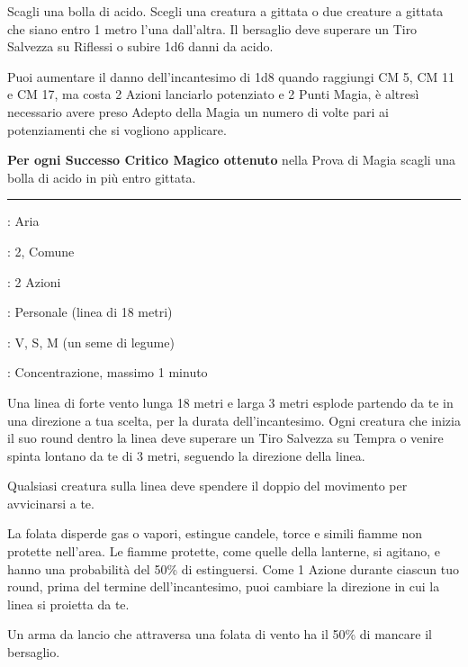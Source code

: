 \begin{multicols}{2}
Scagli una bolla di acido. Scegli una creatura a gittata o due creature a gittata che siano entro 1 metro l'una dall'altra. Il bersaglio deve superare un Tiro Salvezza su Riflessi o subire 1d6 danni da acido.

Puoi aumentare il danno dell'incantesimo di 1d8 quando raggiungi CM 5, CM 11 e CM 17, ma costa 2 Azioni lanciarlo potenziato e 2 Punti Magia, è altresì necessario avere preso Adepto della Magia un numero di volte pari ai potenziamenti che si vogliono applicare.

\textbf{Per ogni Successo Critico Magico ottenuto} nella Prova di Magia scagli una bolla di acido in più entro gittata.

\smallskip\noindent\rule{\linewidth}{2pt} \hypertarget{Folata di Vento}{}\smallskip{}
\noindent
\begin{description}[noitemsep, topsep=0pt, parsep=0pt, partopsep=0pt, leftmargin=0cm, labelwidth=2.8cm]
	\item[\textbf{Lista di Magia}]: Aria
	\item[\textbf{Livello}]: 2, Comune
	\item[\textbf{T. di Lancio}]: 2 Azioni
	\item[\textbf{Gittata}]: Personale (linea di 18 metri)
	\item[\textbf{Componenti}]: V, S, M (un seme di legume)
	\item[\textbf{Durata}]: Concentrazione, massimo 1 minuto
\end{description}

Una linea di forte vento lunga 18 metri e larga 3 metri esplode partendo da te in una direzione a tua scelta, per la durata dell'incantesimo. Ogni creatura che inizia il suo round dentro la linea deve superare un Tiro Salvezza su Tempra o venire spinta lontano da te di 3 metri, seguendo la direzione della linea.

Qualsiasi creatura sulla linea deve spendere il doppio del movimento per avvicinarsi a te.

La folata disperde gas o vapori, estingue candele, torce e simili fiamme non protette nell'area. Le fiamme protette, come quelle della lanterne, si agitano, e hanno una probabilità del 50\% di estinguersi. Come 1 Azione durante ciascun tuo round, prima del termine dell'incantesimo, puoi cambiare la direzione in cui la linea si proietta da te.

Un arma da lancio che attraversa una folata di vento ha il 50\% di mancare il bersaglio.


\end{multicols}
